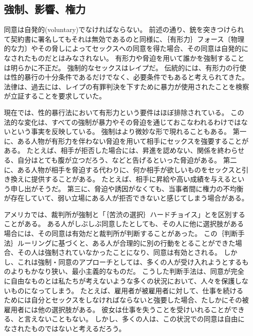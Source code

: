 \documentclass[paper=a4,book,openany]{jlreq}
\begin{document}
\subsection{強制、影響、権力}

同意は自発的(voluntary)でなければならない。
前述の通り、銃を突きつけられて契約書に署名してもそれは無効であるのと同様に、｛有形力｝{フォース}〔物理的な力〕やその脅しによってセックスへの同意を得た場合、その同意は自発的になされたものだとはみなされない。
有形力や脅迫を用いて誰かを強制することは明らかに不正だ。
強制的なセックスはレイプだ。
伝統的には、有形力の行使は性的暴行の十分条件であるだけでなく、必要条件でもあると考えられてきた。
法律は、過去には、レイプの有罪判決を下すために暴力が使用されたことを検察が立証することを要求していた。

現在では、性的暴行法において有形力という要件はほぼ排除されている。
この法的な変化は、すべての強制が暴力やその脅迫を通じておこなわれるわけではないという事実を反映している。
強制はより微妙な形で現れることもある。
第一に、ある人物が有形力を伴わない脅迫を用いて相手にセックスを強要することがある。
たとえば、相手が拒否した場合には、昇進を認めない、関係を終わらせる、自分はとても腹が立つだろう、などと告げるといった脅迫がある。
第二に、ある人物が相手を脅迫する代わりに、何か相手が欲しいものをセックスと引き換えに提供することがある。
たとえば、相手に昇給や高い成績を与えるという申し出がそうだ。
第三に、脅迫や誘因がなくても、当事者間に権力の不均衡が存在していて、弱い立場にある人が拒否できないと感じてしまう場合がある。

アメリカでは、裁判所が強制と「｛苦渋の選択｝{ハードチョイス}」とを区別することがある。
ある人がしぶしぶ同意したとしても、その人に他に選択肢がある場合には、その同意は有効だと裁判所が判断することがあった\citep[p.130]{buchhandler-raphael11:_failur_consen}。
この｛判断手法｝{ルーリング}に基づくと、ある人が合理的に別の行動をとることができた場合、その人は強制されていなかったことになり、同意は有効とされる。
しかし、これは強制・同意のアプローチとしては、多くの人が受け入れようとするものよりもかなり狭い、最小主義的なものだ。
こうした判断手法は、同意が完全に自由なものとは私たちが考えないような多くの状況において、人々を保護しないものになってしまう。
たとえば、雇用者が被雇用者に対して、仕事を続けるためには自分とセックスをしなければならないと強要した場合、たしかにその被雇用者には他の選択肢がある。
彼女は仕事を失うことを受けいれることができる、と言えないこともない。
しかし、多くの人は、この状況での同意は自由になされたものではないと考えるだろう。
\end{document}
